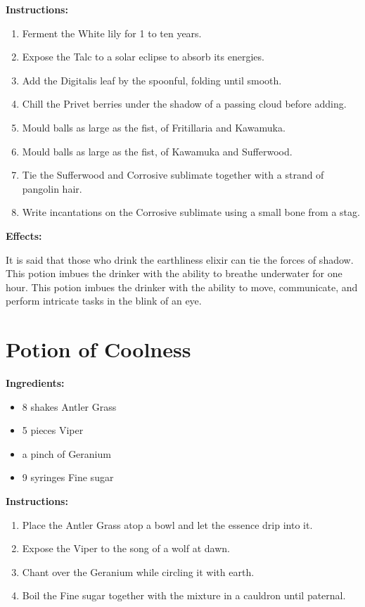 \documentclass{article}
\begin{document}
\textbf{Instructions:}

\begin{enumerate}
  \item Ferment the White lily for 1 to ten years.
  \item Expose the Talc to a solar eclipse to absorb its energies.
  \item Add the Digitalis leaf by the spoonful, folding until smooth.
  \item Chill the Privet berries under the shadow of a passing cloud before adding.
  \item Mould balls as large as the fist, of Fritillaria and Kawamuka.
  \item Mould balls as large as the fist, of Kawamuka and Sufferwood.
  \item Tie the Sufferwood and Corrosive sublimate together with a strand of pangolin hair.
  \item Write incantations on the Corrosive sublimate using a small bone from a stag.
\end{enumerate}

\textbf{Effects:}

It is said that those who drink the earthliness elixir can tie the forces of shadow. This potion imbues the drinker with the ability to breathe underwater for one hour. This potion imbues the drinker with the ability to move, communicate, and perform intricate tasks in the blink of an eye.

\newpage
\section*{Potion of Coolness}

\textbf{Ingredients:}

\begin{itemize}
  \item 8 shakes Antler Grass
  \item 5 pieces Viper
  \item a pinch of Geranium
  \item 9 syringes Fine sugar
\end{itemize}

\textbf{Instructions:}

\begin{enumerate}
  \item Place the Antler Grass atop a bowl and let the essence drip into it.
  \item Expose the Viper to the song of a wolf at dawn.
  \item Chant over the Geranium while circling it with earth.
  \item Boil the Fine sugar together with the mixture in a cauldron until paternal.
\end{enumerate}
\end{document}
